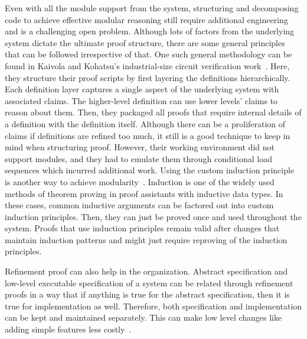 Even with all the module support from the system, structuring and decomposing code to achieve effective modular reasoning still require additional engineering and is a challenging open problem. Although lots of factors from the underlying system dictate the ultimate proof structure, there are some general principles that can be followed irrespective of that. One such general methodology can be found in Kaivola and Kohatsu's industrial-size circuit verification work~\cite{Kaivola_et_al_2003}. Here, they structure their proof scripts by first layering the definitions hierarchically. Each definition layer captures a single aspect of the underlying system with associated claims. The higher-level definition can use lower levels' claims to reason about them. Then, they packaged all proofs that require internal details of a definition with the definition itself. Although there can be a proliferation of claims if definitions are refined too much, it still is a good technique to keep in mind when structuring proof. However, their working environment did not support modules, and they had to emulate them through conditional load sequences which incurred additional work. Using the custom induction principle is another way to achieve modularity~\cite{Woos_et_al_2016}. Induction is one of the widely used methods of theorem proving in proof assistants with inductive data types. In these cases, common inductive arguments can be factored out into custom induction principles. Then, they can just be proved once and used throughout the system. Proofs that use induction principles remain valid after changes that maintain induction patterns and might just require reproving of the induction principles. 

Refinement proof can also help in the organization. Abstract specification and low-level executable specification of a system can be related through refinement proofs in a way that if anything is true for the abstract specification, then it is true for implementation as well. Therefore, both specification and implementation can be kept and maintained separately. This can make low level changes like adding simple features less costly~\cite{Klein_et_al_2014}. \\ 

